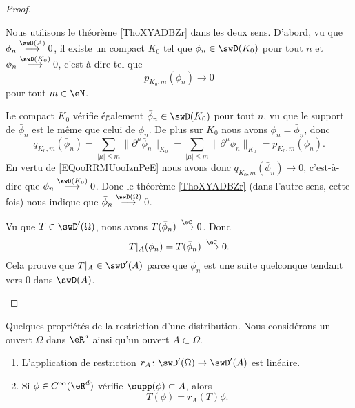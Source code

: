 \begin{proof}
\begin{subproof}

		Nous utilisons le théorème \ref{ThoXYADBZr} dans les deux sens. D'abord, vu que \( \phi_n\stackrel{\swD(A)}{\longrightarrow}0\), il existe un compact \( K_0\) tel que \( \phi_n\in\swD(K_0)\) pour tout \( n\) et \( \phi_n\stackrel{\swD(K_0)}{\longrightarrow}0\), c'est-à-dire tel que
		\begin{equation}        \label{EQooRRMUooIznPeE}
			p_{K_0,m}(\phi_n)\to 0
		\end{equation}
		pour tout \( m\in \eN\).

		Le compact \( K_0\) vérifie également \( \bar\phi_n\in \swD(K_0)\) pour tout \( n\), vu que le support de \( \bar\phi_n\) est le même que celui de \( \phi_n\). De plus sur \( K_0\) nous avons \( \phi_n=\bar\phi_n\), donc
		\begin{equation}
			q_{K_0,m}(\bar\phi_n)=\sum_{| \mu |\leq m}\| \partial^{\mu}\bar\phi_n \|_{K_0}=\sum_{| \mu |\leq m}\| \partial^{\mu}\phi_n \|_{K_0}=p_{K_0,m}(\phi_n).
		\end{equation}
		En vertu de \eqref{EQooRRMUooIznPeE} nous avons donc \( q_{K_0,m}(\bar\phi_n)\to 0\), c'est-à-dire que \( \bar\phi_n\stackrel{\swD(K_0)}{\longrightarrow}0\). Donc le théorème \ref{ThoXYADBZr} (dans l'autre sens, cette fois) nous indique que \( \bar\phi_n\stackrel{\swD(\Omega)}{\longrightarrow}0\).


		\spitem[Conclusion]

		Vu que \( T\in \swD'(\Omega)\), nous avons \( T(\bar\phi_n)\stackrel{\eC}{\longrightarrow}0\). Donc
		\begin{equation}
			T|_A(\phi_n)=T(\bar\phi_n)\stackrel{\eC}{\longrightarrow}0.
		\end{equation}
		Cela prouve que \( T|_A\in \swD'(A)\) parce que \( \phi_n\) est une suite quelconque tendant vers \( 0\) dans \( \swD(A)\).
	\end{subproof}
\end{proof}


\begin{lemma}       \label{LEMooCXIZooAbeMpF}
	Quelques propriétés de la restriction d'une distribution. Nous considérons un ouvert \( \Omega\) dans \( \eR^d\) ainsi qu'un ouvert \( A\subset \Omega\).
	\begin{enumerate}
		\item
		      L'application de restriction \( r_A\colon \swD'(\Omega)\to \swD'(A)\) est linéaire.
		\item       \label{ITEMooGXSKooYomqpg}
		      Si \( \phi\in  C^{\infty}(\eR^d)\) vérifie \( \supp(\phi)\subset A\), alors
		      \begin{equation}
			      T(\phi)=r_A(T)\phi.
		      \end{equation}
	\end{enumerate}
\end{lemma}


